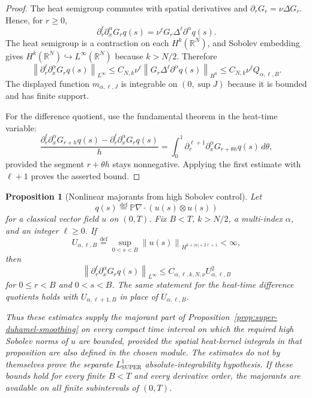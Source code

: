 \documentclass{amsart}
\newtheorem{prop}{Proposition}
\DeclareMathOperator{\SUPER}{SUPER}
\newcommand{\eqdef}{\overset{\mathrm{def}}{=}}
\newcommand{\norm}[1]{\left\lVert #1\right\rVert}
\newcommand{\abs}[1]{\left\lvert #1\right\rvert}
\begin{document}
\begin{proof}
The heat semigroup commutes with spatial derivatives and
$\partial_rG_r=\nu\Delta G_r$.  Hence, for $r\geq0$,
\[
  \partial_r^\ell\partial_x^\alpha G_rq(s)
  =
  \nu^\ell G_r\Delta^\ell\partial^\alpha q(s).
\]
The heat semigroup is a contraction on each $H^k(\mathbb{R}^N)$, and Sobolev
embedding gives $H^k(\mathbb{R}^N)\hookrightarrow L^\infty(\mathbb{R}^N)$
because $k>N/2$.  Therefore
\[
  \norm{\partial_r^\ell\partial_x^\alpha G_rq(s)}_{L^\infty}
  \leq
  C_{N,k}\nu^\ell
  \norm{G_r\Delta^\ell\partial^\alpha q(s)}_{H^k}
  \leq
  C_{N,k}\nu^\ell Q_{\alpha,\ell,B}.
\]
The displayed function $m_{\alpha,\ell,J}$ is integrable on
$(0,\sup J)$ because it is bounded and has finite support.

For the difference quotient, use the fundamental theorem in the heat-time
variable:
\[
  \frac{\partial_r^\ell\partial_x^\alpha G_{r+h}q(s)
        -\partial_r^\ell\partial_x^\alpha G_rq(s)}{h}
  =
  \int_0^1
  \partial_r^{\ell+1}\partial_x^\alpha
  G_{r+\theta h}q(s)\,d\theta ,
\]
provided the segment $r+\theta h$ stays nonnegative.  Applying the first
estimate with $\ell+1$ proves the asserted bound.
\end{proof}

\begin{prop}[Nonlinear majorants from high Sobolev control]
\label{prop:nonlinear-sobolev-majorants}
Let
\[
  q(s)\eqdef\mathbb{P}\nabla\cdot(u(s)\otimes u(s))
\]
for a classical vector field $u$ on $(0,T)$.  Fix $B<T$, $k>N/2$, a
multi-index $\alpha$, and an integer $\ell\geq0$.  If
\[
  U_{\alpha,\ell,B}
  \eqdef
  \sup_{0<s<B}
  \norm{u(s)}_{H^{k+\abs{\alpha}+2\ell+1}}
  <\infty ,
\]
then
\[
  \norm{\partial_r^\ell\partial_x^\alpha G_rq(s)}_{L^\infty}
  \leq C_{\alpha,\ell,k,N,\nu}U_{\alpha,\ell,B}^2
\]
for $0\leq r<B$ and $0<s<B$.  The same statement for the heat-time difference
quotients holds with $U_{\alpha,\ell+1,B}$ in place of
$U_{\alpha,\ell,B}$.

Thus these estimates supply the majorant part of
Proposition~\ref{prop:super-duhamel-smoothing} on every compact time interval
on which the required high Sobolev norms of $u$ are bounded, provided the
spatial heat-kernel integrals in that proposition are also defined in the
chosen module.  The estimates do not by themselves prove the separate
$L^1_{\SUPER}$ absolute-integrability hypothesis.  If these bounds hold for
every finite $B<T$ and every derivative order, the majorants are available on
all finite subintervals of $(0,T)$.
\end{prop}
\end{document}
